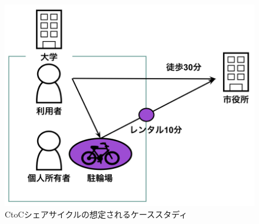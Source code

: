       \begin{figure}[htbp]
        \centering
        \includegraphics[scale=0.52]
        {figures/casestudy.png}
        \caption{CtoCシェアサイクルの想定されるケーススタディ}
        \label{fig:CtoCシェアサイクルの想定されるケーススタディ}
      \end{figure}
  
